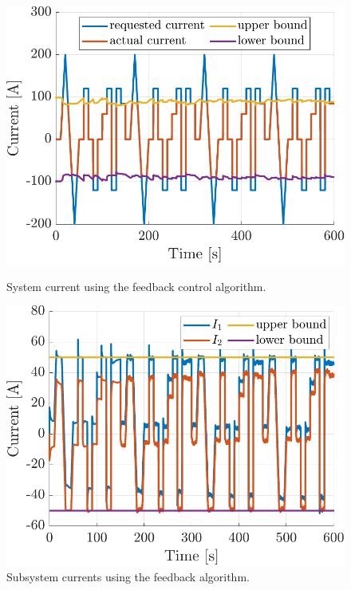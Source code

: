 \begin{figure}
\centering
\begin{minipage}{0.49\textwidth}
    \centering
    \includegraphics[width=\linewidth]{figures/13/fb-system.pdf}
    \caption{System current using the feedback control algorithm.}
    \label{fig:13-fb-system}
\end{minipage}
\hfill
\begin{minipage}{0.49\textwidth}
    \centering
    \includegraphics[width=\linewidth]{figures/13/fb-subsystem.pdf}
    \caption{Subsystem currents using the feedback algorithm.}
    \label{fig:13-fb-subsystem}
\end{minipage}
\end{figure}



